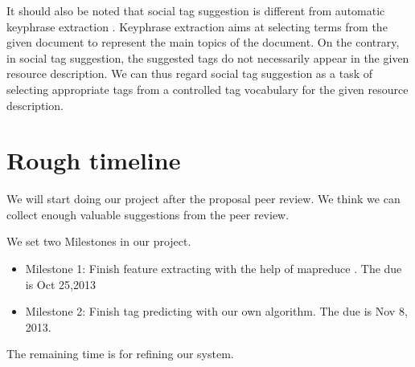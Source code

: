 \documentclass[11pt]{article} %
\begin{document}
It should also be noted that social tag suggestion is different from automatic keyphrase extraction \cite{liu2011automatic}. Keyphrase extraction aims at selecting terms from the given document to represent the main topics of the document. On the contrary, in social tag suggestion, the suggested tags do not necessarily appear in the given resource description. We can thus regard social tag suggestion as a task of selecting appropriate tags from a controlled tag vocabulary for the given resource description.


\section{Rough timeline}

We will start doing our project after the proposal peer review. We think we can collect enough valuable suggestions from the peer review.

We set two Milestones in our project.

\begin{itemize}
\item Milestone 1: Finish feature extracting with the help of mapreduce \cite{dean2008mapreduce}. The due is Oct 25,2013
\item Milestone 2: Finish tag predicting with our own algorithm. The due is Nov 8, 2013.
\end{itemize}

The remaining time is for refining our system.




\end{document}
